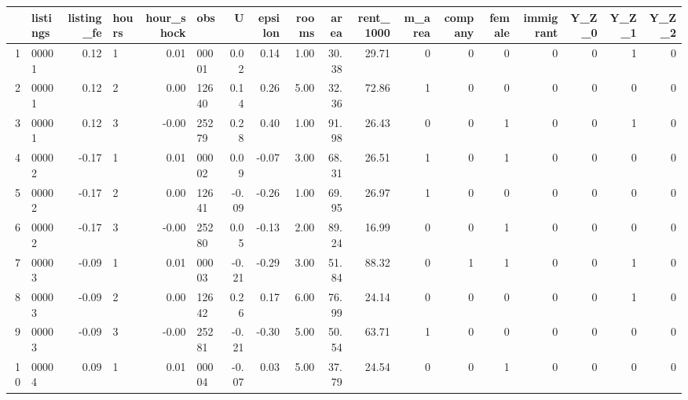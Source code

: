 \begin{table}[ht]
\centering
\begin{tabular}{rlrlrlrrrrrrrrrrrr}
  \hline
 & listings & listing\_fe & hours & hour\_shock & obs & U & epsilon & rooms & area & rent\_1000 & m\_area & company & female & immigrant & Y\_Z\_0 & Y\_Z\_1 & Y\_Z\_2 \\ 
  \hline
1 & 00001 & 0.12 & 1 & 0.01 & 00001 & 0.02 & 0.14 & 1.00 & 30.38 & 29.71 &   0 &   0 &   0 &   0 &   0 &   1 &   0 \\ 
  2 & 00001 & 0.12 & 2 & 0.00 & 12640 & 0.14 & 0.26 & 5.00 & 32.36 & 72.86 &   1 &   0 &   0 &   0 &   0 &   0 &   0 \\ 
  3 & 00001 & 0.12 & 3 & -0.00 & 25279 & 0.28 & 0.40 & 1.00 & 91.98 & 26.43 &   0 &   0 &   1 &   0 &   0 &   1 &   0 \\ 
  4 & 00002 & -0.17 & 1 & 0.01 & 00002 & 0.09 & -0.07 & 3.00 & 68.31 & 26.51 &   1 &   0 &   1 &   0 &   0 &   0 &   0 \\ 
  5 & 00002 & -0.17 & 2 & 0.00 & 12641 & -0.09 & -0.26 & 1.00 & 69.95 & 26.97 &   1 &   0 &   0 &   0 &   0 &   0 &   0 \\ 
  6 & 00002 & -0.17 & 3 & -0.00 & 25280 & 0.05 & -0.13 & 2.00 & 89.24 & 16.99 &   0 &   0 &   1 &   0 &   0 &   0 &   0 \\ 
  7 & 00003 & -0.09 & 1 & 0.01 & 00003 & -0.21 & -0.29 & 3.00 & 51.84 & 88.32 &   0 &   1 &   1 &   0 &   0 &   1 &   0 \\ 
  8 & 00003 & -0.09 & 2 & 0.00 & 12642 & 0.26 & 0.17 & 6.00 & 76.99 & 24.14 &   0 &   0 &   0 &   0 &   0 &   1 &   0 \\ 
  9 & 00003 & -0.09 & 3 & -0.00 & 25281 & -0.21 & -0.30 & 5.00 & 50.54 & 63.71 &   1 &   0 &   0 &   0 &   0 &   0 &   0 \\ 
  10 & 00004 & 0.09 & 1 & 0.01 & 00004 & -0.07 & 0.03 & 5.00 & 37.79 & 24.54 &   0 &   0 &   1 &   0 &   0 &   0 &   0 \\ 
   \hline
\end{tabular}
\end{table}

